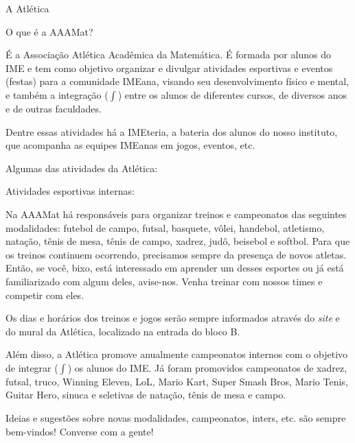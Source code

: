\begin{secao}{A Atlética} %

\begin{subsecao}{O que é a AAAMat?}

É a Associação Atlética Acadêmica da Matemática. É formada por alunos do IME e
tem como objetivo organizar e divulgar atividades esportivas e eventos (festas)
para a comunidade IMEana, visando seu desenvolvimento físico e mental,
e também a integração ($\int$) entre os alunos de diferentes cursos, de diversos
anos e de outras faculdades.

Dentre essas atividades há a IMEteria, a bateria dos alunos do nosso instituto,
que acompanha as equipes IMEanas em jogos, eventos, etc.

\end{subsecao}

Algumas das atividades da Atlética:

\begin{subsecao}{Atividades esportivas internas:}

Na AAAMat há responsáveis para organizar treinos e campeonatos das seguintes
modalidades: futebol de campo, futsal, basquete, vôlei, handebol, atletismo,
natação, tênis de mesa, tênis de campo, xadrez, judô, beisebol e softbol. Para
que os treinos continuem ocorrendo, precisamos sempre da presença de novos
atletas. Então, se você, bixo, está interessado em aprender um desses
esportes ou já está familiarizado com algum deles, avise-nos. Venha treinar com nossos times e competir com eles.

Os dias e horários dos treinos e jogos serão sempre informados através do \textit{site}
e do mural da Atlética, localizado na entrada do bloco B.

Além disso, a Atlética promove anualmente campeonatos internos com o objetivo de
integrar ($\int$) os alunos do IME. Já foram promovidos campeonatos de xadrez,
futsal, truco, Winning Eleven, LoL, Mario Kart, Super Smash Bros, Mario Tenis, Guitar Hero, sinuca e seletivas de natação, tênis de mesa e campo.

Ideias e sugestões sobre novas modalidades, campeonatos, inters, etc. são sempre
 bem-vindos! Converse com a gente!

\end{subsecao}


\end{secao}

